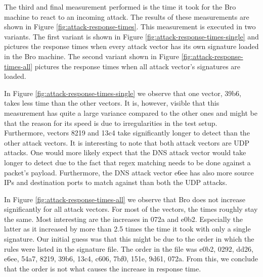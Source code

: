 The third and final measurement performed is the time it took for the Bro machine to react to an incoming attack. The results of these measurements are shown in Figure \ref{fig:attack-response-times}. This measurement is executed in two variants. The first variant is shown in Figure \ref{fig:attack-response-times-single} and pictures the response times when every attack vector has its own signature loaded in the Bro machine. The second variant shown in Figure \ref{fig:attack-response-times-all} pictures the response times when all attack vector's signatures are loaded. 

In Figure \ref{fig:attack-response-times-single} we observe that one vector, 39b6, takes less time than the other vectors. It is, however, visible that this measurement has quite a large variance compared to the other ones and might be that the reason for its speed is due to irregularities in the test setup. Furthermore, vectors 8219 and 13c4 take significantly longer to detect than the other attack vectors. It is interesting to note that both attack vectors are UDP attacks. One would more likely expect that the DNS attack vector would take longer to detect due to the fact that regex matching needs to be done against a packet's payload. Furthermore, the DNS attack vector e6ee has also more source IPs and destination ports to match against than both the UDP attacks. 

In Figure \ref{fig:attack-response-times-all} we observe that Bro does not increase significantly for all attack vectors. For most of the vectors, the times roughly stay the same. Most interesting are the increases in 072a and e0b2. Especially the latter as it increased by more than 2.5 times the time it took with only a single signature. Our initial guess was that this might be due to the order in which the rules were listed in the signature file. The order in the file was e0b2, 0292, dd26, e6ee, 54a7, 8219, 39b6, 13c4, c606, 7bf0, 151e, 9d61, 072a. From this, we conclude that the order is not what causes the increase in response time.  

